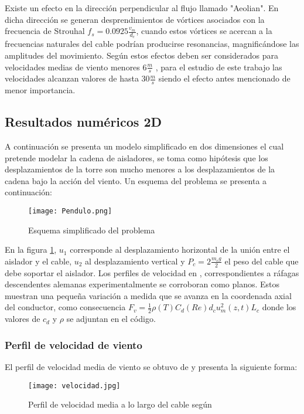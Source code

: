 Existe un efecto en la dirección perpendicular al flujo  llamado "Aeolian". En dicha dirección se generan desprendimientos de vórtices asociados con la frecuencia de Strouhal $f_s=0.0925\frac{v_m}{d_c}$, cuando estos vórtices se acercan a la frecuencias naturales del cable podrían producirse resonancias, magnificándose las amplitudes del movimiento. Según \cite{Belloli2006} estos efectos deben ser considerados para velocidades medias de viento menores $6\frac{m}{s}$ , para el estudio de este trabajo las velocidades alcanzan valores de hasta $30\frac{m}{s}$ siendo el efecto antes mencionado de menor importancia. 

\subsection{Resultados numéricos 2D}
A continuación se presenta un modelo simplificado en dos dimensiones el cual pretende modelar la cadena de aisladores, se toma como hipótesis que los desplazamientos de la torre son mucho menores a los desplazamientos de la cadena bajo la acción del viento. Un esquema del problema se presenta a continuación: 

\begin{figure}[h]
	\centering
	\texttt{[image: Pendulo.png]}
	\caption{Esquema simplificado del problema}
	\label{pendulo}
\end{figure}


En la figura \ref{pendulo}, $u_1$ corresponde al desplazamiento horizontal de la unión entre el aislador y el cable, $u_2$ al desplazamiento vertical y $P_c=2 \frac{m_cg}{2}$ el peso del cable que debe soportar el aislador. Los perfiles de velocidad en \cite{stengel2017measurements}, correspondientes a ráfagas descendentes alemanas experimentalmente se corroboran como planos. Estos  muestran una pequeña variación a medida que se avanza en la coordenada axial del conductor, como consecuencia $F_v=\frac{1}{2}\rho (T)C_d(Re)d_cu_m^2(z,t)L_c$ donde los valores de $c_d$ y $\rho$ se adjuntan en el código. 

\subsubsection{Perfil de velocidad de viento}
El perfil de velocidad media de viento se obtuvo de \cite{stengel2017measurements} y presenta la siguiente forma:


\begin{figure}[h]
	\centering
	\texttt{[image: velocidad.jpg]}
	\caption{Perfil de velocidad media a lo largo del cable según \cite{stengel2017measurements}}
\end{figure}

